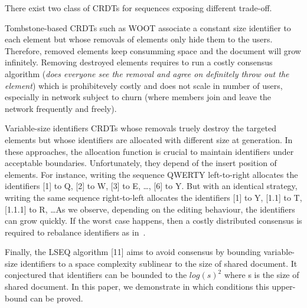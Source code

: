 \begin{asparadesc}
  There exist two class of CRDTs for sequences exposing different
  trade-off.
\item [Tombstone-based] CRDTs such as WOOT\cite{oster2006data}
  associate a constant size identifier to each element but whose
  removals of elements only hide them to the users. Therefore, removed
  elements keep consumming space and the document will grow
  infinitely. Removing destroyed elements requires to run a costly
  consensus algorithm (\emph{does everyone see the removal and agree
    on definitely throw out the element}) which is prohibitevely
  costly and does not scale in number of users, especially in network
  subject to churn (where members join and leave the network
  frequently and freely).

\item [Variable-size identifiers] CRDTs whose removals truely destroy
  the targeted elements but whose identifiers are allocated with
  different size at generation. In these approaches, the allocation
  function is crucial to maintain identifiers under acceptable
  boundaries. Unfortunately, they depend of the insert position of
  elements. For instance, writing the sequence QWERTY left-to-right
  allocates the identifiers [1] to Q, [2] to W, [3] to E, \ldots, [6]
  to Y. But with an identical strategy, writing the same sequence
  right-to-left allocates the identifiers [1] to Y, [1.1] to T,
  [1.1.1] to R, \ldots As we observe, depending on the editing
  behaviour, the identifiers can grow quickly.  If the worst case
  happens, then a costly distributed consensus is required to
  rebalance identifiers as in~\cite{zawirskiasynchronous}.

Finally, the LSEQ algorithm [11] aims to avoid consensus by bounding
variable- size identifiers to a space complexity sublinear to the size
of shared document. It conjectured that identifiers can be bounded to
the $log(s)^2$ where s is the size of shared document. In this paper,
we demonstrate in which conditions  this upper-bound can be proved.

\end{asparadesc}

